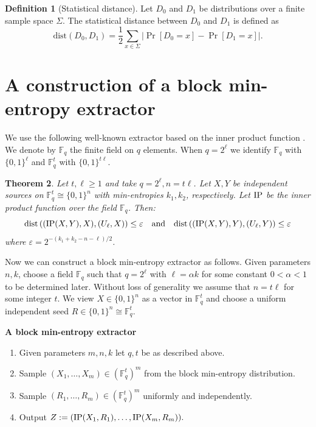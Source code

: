 \documentclass[11pt]{article}
\numberwithin{equation}{section}
\newtheorem{theorem}{Theorem}[section]
\theoremstyle{definition}
\newtheorem{definition}[theorem]{Definition}
\theoremstyle{plain}
\def\dist{\mathrm{dist}}
\newcommand{\IP}{\textnormal{IP}}
\newcommand{\F}{\mathbb{F}}
\newcommand{\eps}{\varepsilon}
\begin{document}
\begin{definition}[Statistical distance]
Let $D_0$ and $D_1$ be distributions over a finite sample space
%
$\Sigma$.   %
The statistical distance between $D_{0}$ and $D_{1}$ is defined as
\[
\dist(D_{0},D_{1}) = 
   \frac{1}{2}\sum_{x\in\Sigma}\big|\Pr[D_{0} = x] - \Pr[D_1 = x]\big|.
\]
\end{definition}


%
%
%


\section{A construction of a block min-entropy extractor} \label{sec:extractor}

We use the following well-known extractor based on the inner product function \cite{chor1988unbiased}. We denote by $\F_q$ the finite field on $q$
elements. When $q=2^{\ell}$ we identify $\F_q$ with $\{0,1\}^{\ell}$ and $\F_q^t$ with $\{0,1\}^{t \ell}$.

\begin{theorem}
\label{strong_ip}
Let $t, \ell \ge 1$ and take $q=2^{\ell}, n =t \ell$. Let $X,Y$ be independent sources on
$\F_q^t \cong \{0,1\}^n$ with min-entropies $k_1,k_2$, respectively. Let $\IP$ be the inner product function over the field $\F_q$. Then:
$$\dist\left((\IP(X,Y), X),(U_\ell, X)\right) \leq \eps \quad \text{and} \quad \dist\left((\IP(X,Y), Y) , (U_\ell, Y)\right) \leq \eps$$
%
%
where $\eps=2^{-(k_1+k_2-n-\ell)/2}$.
\end{theorem}

Now we can construct a block min-entropy extractor as follows. Given parameters $n,k$, choose a field $\F_{q}$ such that
$q=2^{\ell}$ with $\ell=\alpha k$ for some constant $0<\alpha<1$ to be determined later. Without loss of
generality we assume that $n=t \ell$ for some integer $t$. We view $X \in \{0,1\}^n$ as a vector in $\F_q^t$ and choose a uniform independent
seed $R \in \{0, 1\}^n \cong \F_q^t$.

\begin{framed}
\begin{center}
{\bf A block min-entropy extractor}
\end{center}
\begin{enumerate}
\item Given parameters $m,n,k$ let $q,t$ be as described above.
\item Sample $(X_1,\dots,X_m)\in(\F_{q}^{t})^{m}$ from the block min-entropy distribution.
\item Sample $(R_{1},\dots, R_{m}) \in (\F_{q}^{t})^{m}$ uniformly and independently.
\item Output $Z:=(\IP(X_1, R_1),\dots,\IP(X_m, R_m)).$
\end{enumerate}
\end{framed}
\end{document}
